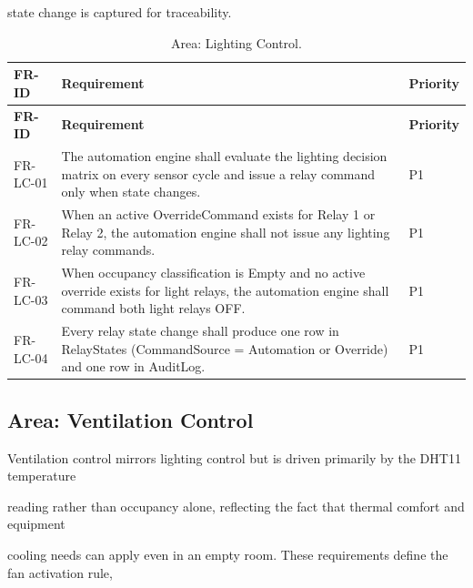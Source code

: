 state change is captured for traceability.

\begin{longtable}{|L{2.0cm}|L{12.0cm}|L{1.5cm}|}
	\caption{Area: Lighting Control.} \label{tab:3-10}                                                                                                                                     \\
	\hline
	\textbf{FR-ID} & \textbf{Requirement}                                                                                                                              & \textbf{Priority} \\
	\hline
	\endfirsthead
	\hline
	\textbf{FR-ID} & \textbf{Requirement}                                                                                                                              & \textbf{Priority} \\
	\hline
	\endhead
	\hline
	\endfoot
	\hline
	\endlastfoot
	FR-LC-01       & The automation engine shall evaluate the lighting decision matrix on every sensor cycle and issue a relay command only when state changes.        & P1                \\
	\hline
	FR-LC-02       & When an active OverrideCommand exists for Relay 1 or Relay 2, the automation engine shall not issue any lighting relay commands.                  & P1                \\
	\hline
	FR-LC-03       & When occupancy classification is Empty and no active override exists for light relays, the automation engine shall command both light relays OFF. & P1                \\
	\hline
	FR-LC-04       & Every relay state change shall produce one row in RelayStates (CommandSource = Automation or Override) and one row in AuditLog.                   & P1                \\
	\hline
\end{longtable}


\subsection{Area: Ventilation Control}
Ventilation control mirrors lighting control but is driven primarily by the DHT11 temperature

reading rather than occupancy alone, reflecting the fact that thermal comfort and equipment

cooling needs can apply even in an empty room. These requirements define the fan activation rule,

